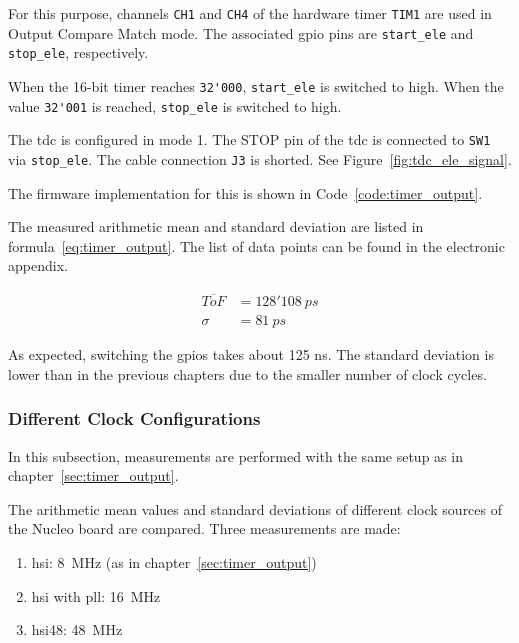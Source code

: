 For this purpose, channels \lstinline|CH1| and \lstinline|CH4| of the hardware timer \lstinline|TIM1| are used in Output Compare Match mode.
The associated \acrshort{gpio} pins are \lstinline|start_ele| and \lstinline|stop_ele|, respectively.

When the 16-bit timer reaches \lstinline|32'000|, \lstinline|start_ele| is switched to high. When the
value \lstinline|32'001| is reached, \lstinline|stop_ele| is switched to high.

The \acrshort{tdc} is configured in mode 1. The STOP pin of the \acrshort{tdc} is connected to \lstinline|SW1| via
\lstinline|stop_ele|. The cable connection \lstinline|J3| is shorted. See
Figure~\ref{fig:tdc_ele_signal}.

The firmware implementation for this is shown in Code~\ref{code:timer_output}.



The measured arithmetic mean and standard deviation are listed in formula~\ref{eq:timer_output}. The list of data points
can be found in the electronic appendix.

\begin{equation}\label{eq:timer_output}
      \begin{split}
            \overline{ToF} & =128'108~ps \\
            \sigma         & = 81~ps
      \end{split}
\end{equation}

As expected, switching the \acrshort{gpio}s takes about 125 ns. The standard deviation is lower than in the previous chapters due to the smaller
number of clock cycles.

\subsubsection{Different Clock Configurations}

In this subsection, measurements are performed with the same setup as in chapter~\ref{sec:timer_output}.

The arithmetic mean values and standard deviations of different clock sources of the Nucleo board are compared.
Three measurements are made:

\begin{enumerate}
      \item \acrshort{hsi}: 8~MHz (as in chapter~\ref{sec:timer_output})
      \item \acrshort{hsi} with \acrshort{pll}: 16~MHz
      \item \acrshort{hsi}48: 48~MHz
\end{enumerate}

